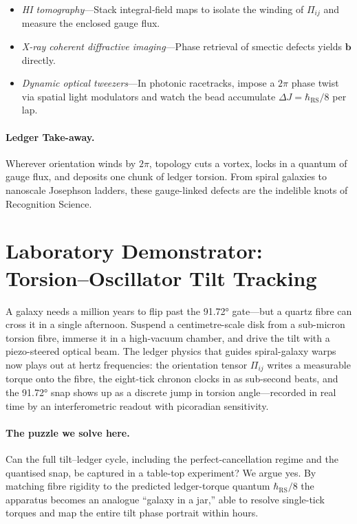 \documentclass[11pt,oneside]{book}
\begin{document}
\begin{itemize}[leftmargin=*,itemsep=2pt]
\item \emph{HI tomography}––Stack integral‐field maps to isolate the
      winding of $\Pi_{ij}$ and measure the enclosed gauge flux.
\item \emph{X-ray coherent diffractive imaging}––Phase retrieval of
      smectic defects yields $\mathbf b$ directly.
\item \emph{Dynamic optical tweezers}––In photonic racetracks,
      impose a $2\pi$ phase twist via spatial light modulators and
      watch the bead accumulate $\Delta J=\hbar_{\text{RS}}/8$ per lap.
\end{itemize}

\paragraph{Ledger Take-away.}
Wherever orientation winds by $2\pi$, topology cuts a vortex, locks in
a quantum of gauge flux, and deposits one chunk of ledger torsion.
From spiral galaxies to nanoscale Josephson ladders, these
gauge-linked defects are the indelible knots of Recognition Science.


\section{Laboratory Demonstrator: Torsion–Oscillator Tilt Tracking}
\label{sec:torsion-osc-demo}

A galaxy needs a million years to flip past the 91.72° gate—but a
quartz fibre can cross it in a single afternoon.  
Suspend a centimetre-scale disk from a sub-micron torsion fibre,
immerse it in a high-vacuum chamber, and drive the tilt with a
piezo-steered optical beam.  
The ledger physics that guides spiral-galaxy warps now plays out at
hertz frequencies: the orientation tensor \(\Pi_{ij}\) writes a
measurable torque onto the fibre, the eight-tick chronon clocks in as
sub-second beats, and the 91.72° snap shows up as a discrete jump in
torsion angle—recorded in real time by an interferometric readout with
picoradian sensitivity.

\paragraph{The puzzle we solve here.}
Can the full tilt–ledger cycle, including the perfect-cancellation
regime and the quantised snap, be captured in a table-top experiment?  
We argue yes.  By matching fibre rigidity to the predicted
ledger-torque quantum \(\hbar_{\mathrm{RS}}/8\) the apparatus becomes
an analogue “galaxy in a jar,” able to resolve single-tick torques and
map the entire tilt phase portrait within hours.
\end{document}
